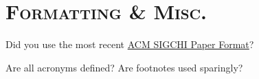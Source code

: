 \documentclass[12pt]{article} %
\begin{document}
\noindent\makebox[\linewidth]{\rule{\linewidth}{0.4pt}}
\section*{\textsc{Formatting \& Misc.}}
\vspace{0.5cm}

\begin{checklist}
 	\item Did you use the most recent \href{https://chi2021.acm.org/for-authors/chi-publication-formats}{ACM SIGCHI Paper Format}?
	\item Are all acronyms defined? Are footnotes used sparingly? 
\end{checklist}








%
%
%
\end{document}
